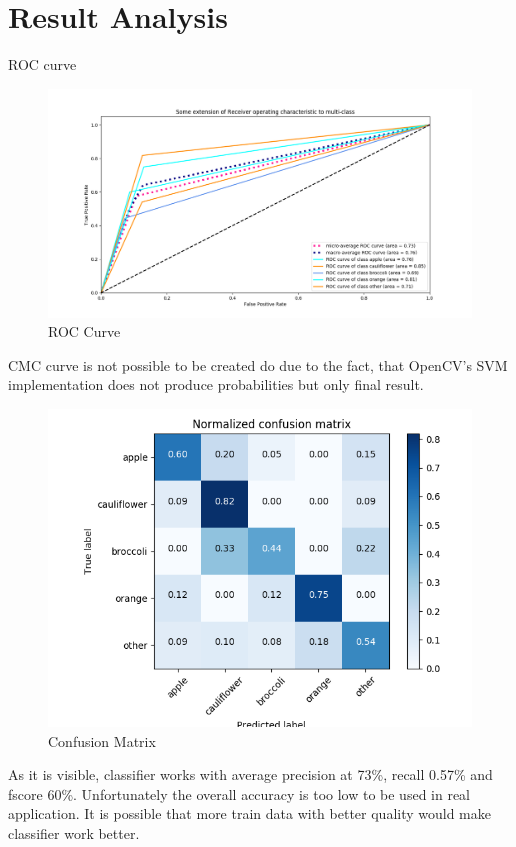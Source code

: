\documentclass[a4paper, 11pt]{article}
\begin{document}
\section*{Result Analysis}

ROC curve

\begin{figure}[!htbp]
\includegraphics[scale=0.5]{results/roc.png}
\centering
\caption{ROC Curve}
\end{figure}


CMC curve is not possible to be created do due to the fact, that OpenCV's SVM implementation does not produce probabilities but only final result.


\begin{figure}[!htbp]
\includegraphics[scale=1]{results/confusion_matrix.png}
\centering
\caption{Confusion Matrix}
\end{figure}


As it is visible, classifier works with average precision at 73\%, recall 0.57\% and fscore 60\%. Unfortunately the overall accuracy is too low to be used in real application. It is possible that more train data with better quality would make classifier work better.
\end{document}
